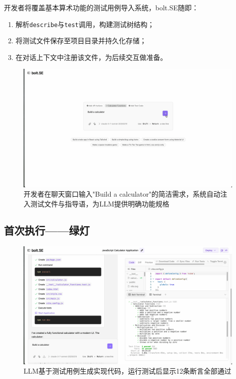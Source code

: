 开发者将覆盖基本算术功能的测试用例导入系统，bolt.SE随即：

\begin{enumerate}
  \item 解析\verb|describe|与\verb|test|调用，构建测试树结构；
  \item 将测试文件保存至项目目录并持久化存储；
  \item 在对话上下文中注册该文件，为后续交互做准备。
\end{enumerate}

\begin{figure}[htbp]
  \centering
  \includegraphics[width=.9\textwidth]{figures/screenshots/tdd/calculator_prompt.png}
  \caption{开发者在聊天窗口输入"Build a calculator"的简洁需求，系统自动注入测试文件与指导语，为LLM提供明确功能规格}
  \label{fig:tdd_prompt}
\end{figure}

\subsection{首次执行——绿灯}

\begin{figure}[htbp]
  \centering
  \includegraphics[width=.9\textwidth]{figures/screenshots/tdd/green_pass_initial.png}
  \caption{LLM基于测试用例生成实现代码，运行测试后显示12条断言全部通过}
  \label{fig:tdd_green_initial}
\end{figure}

